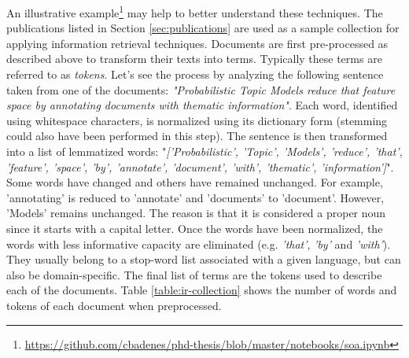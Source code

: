 An illustrative example\footnote{\url{https://github.com/cbadenes/phd-thesis/blob/master/notebooks/soa.ipynb}} may help to better understand these techniques. The publications listed in Section \ref{sec:publications} are used as a sample collection for applying information retrieval techniques. Documents are first pre-processed as described above to transform their texts into terms. Typically these terms are referred to as \textit{tokens}. Let's see the process by analyzing the following sentence taken from one of the documents: \textit{"Probabilistic Topic Models reduce that feature space by annotating documents with thematic information"}. Each word, identified using whitespace characters, is normalized using its dictionary form (stemming could also have been performed in this step). The sentence is then transformed into a list of lemmatized words: "\textit{['Probabilistic', 'Topic', 'Models', 'reduce', 'that', 'feature', 'space', 'by', 'annotate', 'document', 'with', 'thematic', 'information']}". Some words have changed and others have remained unchanged. For example, 'annotating' is reduced to 'annotate' and 'documents' to 'document'. However, 'Models' remains unchanged. The reason is that it is considered a proper noun since it starts with a capital letter. Once the words have been normalized, the words with less informative capacity are eliminated (e.g. \textit{'that'}, \textit{'by'} and \textit{'with'}). They usually belong to a stop-word list associated with a given language, but can also be domain-specific. The final list of terms are the tokens used to describe each of the documents.  Table \ref{table:ir-collection} shows the number of words and tokens of each document when preprocessed.


